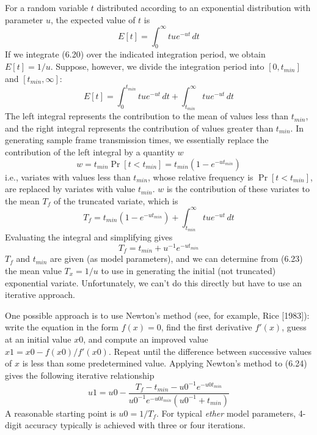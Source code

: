 For a random variable $t$ distributed according to an exponential distribution with parameter $u$, the expected value of $t$ is
\begin{equation} E[t]=\int_0^\infty tu e^{-ut}\,dt \end{equation}
If we integrate (6.20) over the indicated integration period, we obtain $E[t]=1/u$. Suppose, however, we divide the integration period into $[0,t_{min}]$ and $[t_{min},\infty]$:
\begin{equation} E[t]=\int_0^{t_{min}}tu e^{-ut}\,dt+\int_{t_{min}}^\infty tu e^{-ut}\,dt \end{equation}
The left integral represents the contribution to the mean of values less than $t_{min}$, and the right integral represents the contribution of values greater than $t_{min}$. In generating sample frame transmission times, we essentially replace the contribution of the left integral by a quantity $w$
\begin{equation} w=t_{min}\Pr[t<t_{min}]=t_{min}(1-e^{-ut_{min}}) \end{equation}
i.e., variates with values less than $t_{min}$, whose relative frequency is $\Pr[t<t_{min}]$, are replaced by variates with value $t_{min}$. $w$ is the contribution of these variates to the mean $T_f$ of the truncated variate, which is
\begin{equation} T_f=t_{min}(1-e^{-ut_{min}})+\int_{t_{min}}^\infty tu e^{-ut}\,dt \end{equation}
Evaluating the integral and simplifying gives
\begin{equation} T_f=t_{min}+u^{-1}e^{-ut_{min}} \end{equation}
$T_f$ and $t_{min}$ are given (as model parameters), and we can determine from (6.23) the mean value $T_x=1/u$ to use in generating the initial (not truncated) exponential variate. Unfortunately, we can't do this directly but have to use an iterative approach.

One possible approach is to use Newton's method (see, for example, Rice [1983]): write the equation in the form $f(x)=0$, find the first derivative $f'(x)$, guess at an initial value $x0$, and compute an improved value $x1=x0-f(x0)/f'(x0)$. Repeat until the difference between successive values of $x$ is less than some predetermined value. Applying Newton's method to (6.24) gives the following iterative relationship
\begin{equation} u1=u0-\frac{T_f-t_{min}-u0^{-1}e^{-u0t_{min}}}{u0^{-1}e^{-u0t_{min}}(u0^{-1}+t_{min})} \end{equation}
A reasonable starting point is $u0=1/T_f$. For typical \emph{ether} model parameters, 4-digit accuracy typically is achieved with three or four iterations.

